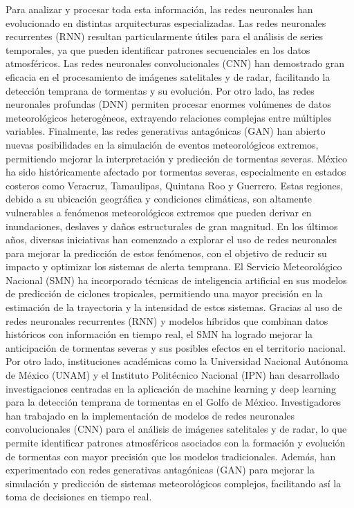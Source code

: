 \documentclass{article}
\begin{document}
Para analizar y procesar toda esta información, las redes neuronales han evolucionado en distintas arquitecturas especializadas. Las redes neuronales recurrentes (RNN) resultan particularmente útiles para el análisis de series temporales, ya que pueden identificar patrones secuenciales en los datos atmosféricos. Las redes neuronales convolucionales (CNN) han demostrado gran eficacia en el procesamiento de imágenes satelitales y de radar, facilitando la detección temprana de tormentas y su evolución. Por otro lado, las redes neuronales profundas (DNN) permiten procesar enormes volúmenes de datos meteorológicos heterogéneos, extrayendo relaciones complejas entre múltiples variables. Finalmente, las redes generativas antagónicas (GAN) han abierto nuevas posibilidades en la simulación de eventos meteorológicos extremos, permitiendo mejorar la interpretación y predicción de tormentas severas.
México ha sido históricamente afectado por tormentas severas, especialmente en estados costeros como Veracruz, Tamaulipas, Quintana Roo y Guerrero. Estas regiones, debido a su ubicación geográfica y condiciones climáticas, son altamente vulnerables a fenómenos meteorológicos extremos que pueden derivar en inundaciones, deslaves y daños estructurales de gran magnitud. En los últimos años, diversas iniciativas han comenzado a explorar el uso de redes neuronales para mejorar la predicción de estos fenómenos, con el objetivo de reducir su impacto y optimizar los sistemas de alerta temprana.
El Servicio Meteorológico Nacional (SMN) ha incorporado técnicas de inteligencia artificial en sus modelos de predicción de ciclones tropicales, permitiendo una mayor precisión en la estimación de la trayectoria y la intensidad de estos sistemas. Gracias al uso de redes neuronales recurrentes (RNN) y modelos híbridos que combinan datos históricos con información en tiempo real, el SMN ha logrado mejorar la anticipación de tormentas severas y sus posibles efectos en el territorio nacional.
Por otro lado, instituciones académicas como la Universidad Nacional Autónoma de México (UNAM) y el Instituto Politécnico Nacional (IPN) han desarrollado investigaciones centradas en la aplicación de machine learning y deep learning para la detección temprana de tormentas en el Golfo de México. Investigadores han trabajado en la implementación de modelos de redes neuronales convolucionales (CNN) para el análisis de imágenes satelitales y de radar, lo que permite identificar patrones atmosféricos asociados con la formación y evolución de tormentas con mayor precisión que los modelos tradicionales. Además, han experimentado con redes generativas antagónicas (GAN) para mejorar la simulación y predicción de sistemas meteorológicos complejos, facilitando así la toma de decisiones en tiempo real.
\end{document}
